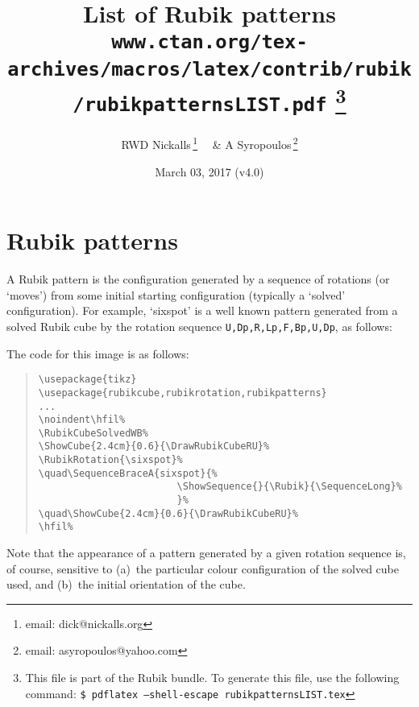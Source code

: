 \documentclass[a4paper]{article}
\begin{document}
\ifpdf{}\fi
\title{List of Rubik patterns\\%
\smallskip\normalsize\texttt{www.ctan.org/tex-archives/macros/latex/contrib/rubik/rubikpatternsLIST.pdf}%
\footnote{This file is part of the Rubik bundle. To generate this file, 
use the following command: 
\newline \texttt{\$ pdflatex --shell-escape  rubikpatternsLIST.tex}}}
\author{RWD Nickalls\,\footnote{email: \textsf{dick@nickalls.org}}%
  \ \ \& A Syropoulos\,\footnote{email: \textsf{asyropoulos@yahoo.com}}}
\date{March 03, 2017 (v4.0)}
\maketitle


\section{Rubik patterns}



A Rubik pattern  is the configuration generated by a sequence of rotations 
(or `moves') from some initial starting configuration (typically a `solved' 
configuration). For example, `sixspot' is a well known pattern  generated  from 
a solved Rubik cube by the  rotation sequence  \texttt{U,Dp,R,Lp,F,Bp,U,Dp}, as follows:


\bigskip

\noindent\hfil%
\RubikCubeSolvedWB
{}%
\RubikRotation{\sixspot}%
\quad{}\quad%
%
\hfil%

\bigskip


\medskip
{\noindent}The code for this image is as follows:

\begin{quote}
\begin{verbatim}
\usepackage{tikz}
\usepackage{rubikcube,rubikrotation,rubikpatterns} 
...
\noindent\hfil%
\RubikCubeSolvedWB%
\ShowCube{2.4cm}{0.6}{\DrawRubikCubeRU}%
\RubikRotation{\sixspot}%
\quad\SequenceBraceA{sixspot}{%
                        \ShowSequence{}{\Rubik}{\SequenceLong}%
                        }%
\quad\ShowCube{2.4cm}{0.6}{\DrawRubikCubeRU}%
\hfil%
\end{verbatim}
\end{quote}


Note that the  appearance of a pattern generated by  a given rotation sequence is,  
of course, sensitive  to (a)~the particular colour configuration of the solved 
cube used, and (b)~the initial  orientation of the cube.
\end{document}
